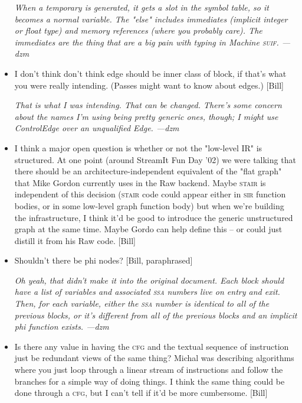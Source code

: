 \documentclass[11pt]{article}
\def\cfg{\textsc{cfg}}
\def\sir{\textsc{sir}}
\def\ssa{\textsc{ssa}}
\def\stair{\textsc{stair}}
\def\suif{\textsc{suif}}
\def\machsuif{Machine \suif}
\begin{document}
\begin{itemize}
  \emph{When a temporary is generated, it gets a slot in the symbol
    table, so it becomes a normal variable.  The "else" includes
    immediates (implicit integer or float type) and memory references
    (where you probably care).  The immediates are the thing that are
    a big pain with typing in \machsuif.  ---dzm}
  
\item I don't think don't think edge should be inner class of block,
  if that's what you were really intending.  (Passes might want to
  know about edges.)  [Bill]
  
  \emph{That is what I was intending.  That can be changed.  There's
    some concern about the names I'm using being pretty generic ones,
    though; I might use ControlEdge over an unqualified Edge.  ---dzm}
  
\item I think a major open question is whether or not the "low-level
  IR" is structured.  At one point (around StreamIt Fun Day '02) we
  were talking that there should be an architecture-independent
  equivalent of the "flat graph" that Mike Gordon currently uses in
  the Raw backend.  Maybe \stair{} is independent of this decision
  (\stair{} code could appear either in \sir{} function bodies, or in
  some low-level graph function body) but when we're building the
  infrastructure, I think it'd be good to introduce the generic
  unstructured graph at the same time.  Maybe Gordo can help define
  this -- or could just distill it from his Raw code.  [Bill]

\item Shouldn't there be phi nodes?  [Bill, paraphrased]

  \emph{Oh yeah, that didn't make it into the original document.  Each
    block should have a list of variables and associated \ssa{}
    numbers live on entry and exit.  Then, for each variable, either
    the \ssa{} number is identical to all of the previous blocks, or
    it's different from all of the previous blocks and an implicit phi
    function exists.  ---dzm}
  
\item Is there any value in having the \cfg{} and the textual sequence
  of instruction just be redundant views of the same thing?  Michal
  was describing algorithms where you just loop through a linear
  stream of instructions and follow the branches for a simple way of
  doing things.  I think the same thing could be done through a \cfg,
  but I can't tell if it'd be more cumbersome.  [Bill]
  

\end{itemize}
\end{document}
